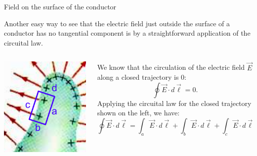 \begin{frame}{Field on the surface of the conductor}

Another easy way to see that the electric field just outside the surface
of a conductor has no tangential component
is by a straightforward application of the circuital law.\\

\vspace{0.3cm}

\begin{columns}
  \begin{column}{0.30\textwidth}
   \begin{center}
     \includegraphics[width=0.99\textwidth]{./images/schematics/conductor_no_tangential_component_circuital_law.png}\\
   \end{center}
  \end{column}
  \begin{column}{0.70\textwidth}
     We know that the circulation of the electric field $\vec{E}$ along a closed trajectory is 0:
     \begin{equation*}
       \oint \vec{E} \cdot d\vec{\ell} = 0.
     \end{equation*}
     Applying the circuital law for the closed trajectory shown on the left, we have:
     \begin{equation*}
       \oint \vec{E} \cdot d\vec{\ell} =
        \int_{a} \vec{E} \cdot d\vec{\ell} + \int_{b} \vec{E} \cdot d\vec{\ell}
        + \int_{c} \vec{E} \cdot d\vec{\ell} + \int_{d} \vec{E} \cdot d\vec{\ell} = 0.
     \end{equation*}
  \end{column}
\end{columns}

\end{frame}


